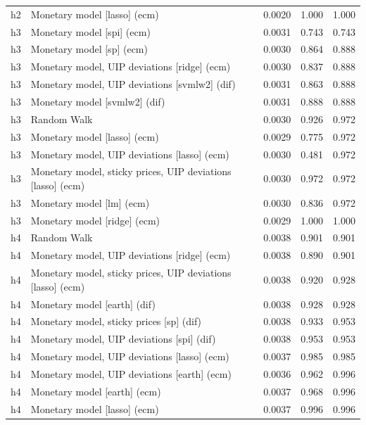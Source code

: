\begin{ThreePartTable}
\begin{longtable}[t]{cp{5.5cm}ccc}
h2 & \raggedright Monetary model [lasso] (ecm) & 0.0020 & 1.000 & 1.000\\
\addlinespace
h3 & \raggedright Monetary model [spi] (ecm) & 0.0031 & 0.743 & 0.743\\
h3 & \raggedright Monetary model [sp] (ecm) & 0.0030 & 0.864 & 0.888\\
h3 & \raggedright Monetary model, UIP deviations [ridge] (ecm) & 0.0030 & 0.837 & 0.888\\
h3 & \raggedright Monetary model, UIP deviations [svmlw2] (dif) & 0.0031 & 0.863 & 0.888\\
h3 & \raggedright Monetary model [svmlw2] (dif) & 0.0031 & 0.888 & 0.888\\
h3 & \raggedright Random Walk & 0.0030 & 0.926 & 0.972\\
h3 & \raggedright Monetary model [lasso] (ecm) & 0.0029 & 0.775 & 0.972\\
h3 & \raggedright Monetary model, UIP deviations [lasso] (ecm) & 0.0030 & 0.481 & 0.972\\
h3 & \raggedright Monetary model, sticky prices, UIP deviations [lasso] (ecm) & 0.0030 & 0.972 & 0.972\\
h3 & \raggedright Monetary model [lm] (ecm) & 0.0030 & 0.836 & 0.972\\
h3 & \raggedright Monetary model [ridge] (ecm) & 0.0029 & 1.000 & 1.000\\
\addlinespace
h4 & \raggedright Random Walk & 0.0038 & 0.901 & 0.901\\
h4 & \raggedright Monetary model, UIP deviations [ridge] (ecm) & 0.0038 & 0.890 & 0.901\\
h4 & \raggedright Monetary model, sticky prices, UIP deviations [lasso] (ecm) & 0.0038 & 0.920 & 0.928\\
h4 & \raggedright Monetary model [earth] (dif) & 0.0038 & 0.928 & 0.928\\
h4 & \raggedright Monetary model, sticky prices [sp] (dif) & 0.0038 & 0.933 & 0.953\\
h4 & \raggedright Monetary model, UIP deviations [spi] (dif) & 0.0038 & 0.953 & 0.953\\
h4 & \raggedright Monetary model, UIP deviations [lasso] (ecm) & 0.0037 & 0.985 & 0.985\\
h4 & \raggedright Monetary model, UIP deviations [earth] (ecm) & 0.0036 & 0.962 & 0.996\\
h4 & \raggedright Monetary model [earth] (ecm) & 0.0037 & 0.968 & 0.996\\
h4 & \raggedright Monetary model [lasso] (ecm) & 0.0037 & 0.996 & 0.996\\

\end{longtable}
\end{ThreePartTable}
